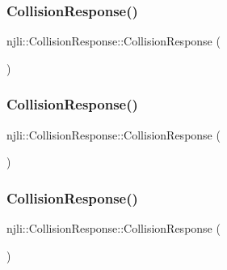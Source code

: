 \subsubsection{\texorpdfstring{Collision\+Response()}{CollisionResponse()}\hspace{0.1cm}{\footnotesize\ttfamily [1/3]}}
{\footnotesize\ttfamily njli\+::\+Collision\+Response\+::\+Collision\+Response (\begin{DoxyParamCaption}{ }\end{DoxyParamCaption})\hspace{0.3cm}{\ttfamily [protected]}}

\mbox{\label{classnjli_1_1_collision_response_a24e7db05ad1d9b24bd59634614eb87ff}} 
\subsubsection{\texorpdfstring{Collision\+Response()}{CollisionResponse()}\hspace{0.1cm}{\footnotesize\ttfamily [2/3]}}
{\footnotesize\ttfamily njli\+::\+Collision\+Response\+::\+Collision\+Response (\begin{DoxyParamCaption}\item[{const \mbox{\hyperlink{classnjli_1_1_abstract_builder}{Abstract\+Builder}} \&}]{ }\end{DoxyParamCaption})\hspace{0.3cm}{\ttfamily [protected]}}

\mbox{\label{classnjli_1_1_collision_response_a0487102f92add4ba625883d0f67e8db6}} 
\subsubsection{\texorpdfstring{Collision\+Response()}{CollisionResponse()}\hspace{0.1cm}{\footnotesize\ttfamily [3/3]}}
{\footnotesize\ttfamily njli\+::\+Collision\+Response\+::\+Collision\+Response (\begin{DoxyParamCaption}\item[{const \mbox{\hyperlink{classnjli_1_1_collision_response}{Collision\+Response}} \&}]{ }\end{DoxyParamCaption})\hspace{0.3cm}{\ttfamily [protected]}}

